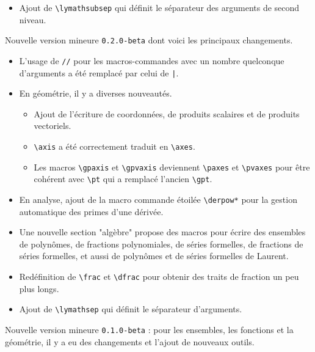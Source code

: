 \documentclass[12pt,a4paper]{article}
\begin{document}
\begin{description}[leftmargin=1em]
\begin{itemize}
		\item Ajout de \verb+\lymathsubsep+ qui définit le séparateur des arguments de second niveau.
	\end{itemize}


	\item[2019-02-21] Nouvelle version mineure \verb+0.2.0-beta+ dont voici les principaux changements.
	\begin{itemize}
		\item L'usage de \verb+//+ pour les macros-commandes avec un nombre quelconque d'arguments a été remplacé par celui de \verb+|+.

		\item En géométrie, il y a diverses nouveautés.
		\begin{itemize}
			\item Ajout de l'écriture de coordonnées, de produits scalaires et de produits vectoriels.

			\item \verb+\axis+ a été correctement traduit en \verb+\axes+.

			\item Les macros \verb+\gpaxis+ et \verb+\gpvaxis+ deviennent \verb+\paxes+ et \verb+\pvaxes+ pour être cohérent avec \verb+\pt+ qui a remplacé l'ancien \verb+\gpt+.
		\end{itemize}

		\item En analyse, ajout de la macro commande étoilée \verb+\derpow*+ pour la gestion automatique des primes d'une dérivée.

		\item Une nouvelle section "algèbre" propose des macros pour écrire des ensembles de polynômes, de fractions polynomiales, de séries formelles, de fractions de séries formelles, et aussi de polynômes et de séries formelles de Laurent.

		\item Redéfinition de \verb+\frac+ et \verb+\dfrac+ pour obtenir des traits de fraction un peu plus longs.

		\item Ajout de \verb+\lymathsep+ qui définit le séparateur d'arguments.
	\end{itemize}


	\item[2017-11-01] Nouvelle version mineure \verb+0.1.0-beta+ : pour les ensembles, les fonctions et la géométrie, il y a eu des changements et l'ajout de nouveaux outils.


\end{description}
\end{document}
